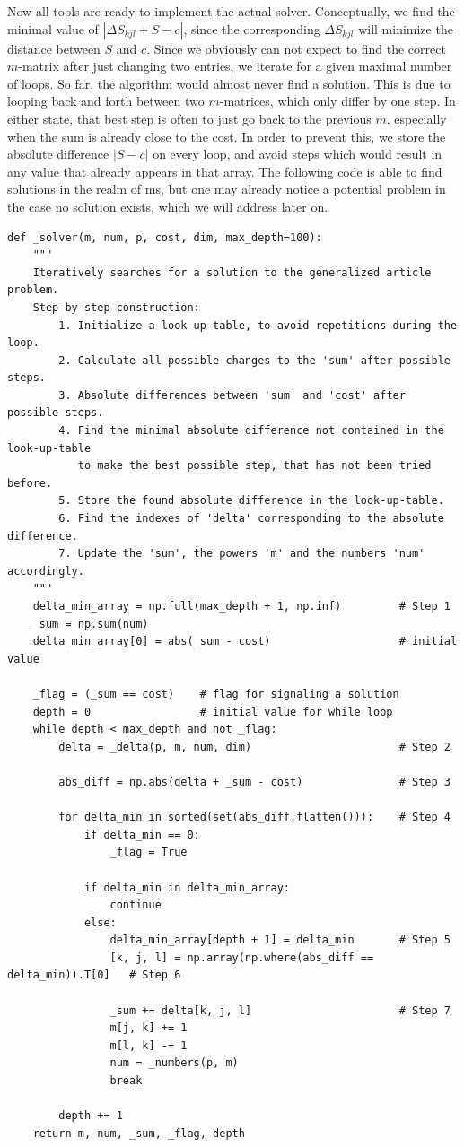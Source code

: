 \documentclass[english, parskip=full]{scrartcl}
\begin{document}
Now all tools are ready to implement the actual solver. Conceptually, we find the minimal value of $|\Delta S_{kjl}+S-c|$, since the corresponding $\Delta S_{kjl}$ will minimize the distance between $S$ and $c$. Since we obviously can not expect to find the correct $m$-matrix after just changing two entries, we iterate for a given maximal number of loops. So far, the algorithm would almost never find a solution. This is due to looping back and forth between two $m$-matrices, which only differ by one step. In either state, that best step is often to just go back to the previous $m$, especially when the sum is already close to the cost. In order to prevent this, we store the absolute difference $|S-c|$ on every loop, and avoid steps which would result in any value that already appears in that array. The following code is able to find solutions in the realm of ms, but one may already notice a potential problem in the case no solution exists, which we will address later on.
\begin{verbatim}
def _solver(m, num, p, cost, dim, max_depth=100):
    """
    Iteratively searches for a solution to the generalized article problem.
    Step-by-step construction:
        1. Initialize a look-up-table, to avoid repetitions during the loop.
        2. Calculate all possible changes to the 'sum' after possible steps.
        3. Absolute differences between 'sum' and 'cost' after possible steps.
        4. Find the minimal absolute difference not contained in the look-up-table 
           to make the best possible step, that has not been tried before.
        5. Store the found absolute difference in the look-up-table.
        6. Find the indexes of 'delta' corresponding to the absolute difference.
        7. Update the 'sum', the powers 'm' and the numbers 'num' accordingly.
    """
    delta_min_array = np.full(max_depth + 1, np.inf)         # Step 1
    _sum = np.sum(num)
    delta_min_array[0] = abs(_sum - cost)                    # initial value
    
    _flag = (_sum == cost)    # flag for signaling a solution
    depth = 0                 # initial value for while loop
    while depth < max_depth and not _flag:
        delta = _delta(p, m, num, dim)                       # Step 2
        
        abs_diff = np.abs(delta + _sum - cost)               # Step 3
            
        for delta_min in sorted(set(abs_diff.flatten())):    # Step 4
            if delta_min == 0:
                _flag = True
                
            if delta_min in delta_min_array:
                continue
            else:
                delta_min_array[depth + 1] = delta_min       # Step 5
                [k, j, l] = np.array(np.where(abs_diff == delta_min)).T[0]   # Step 6
                
                _sum += delta[k, j, l]                       # Step 7     
                m[j, k] += 1                  
                m[l, k] -= 1
                num = _numbers(p, m)
                break
            
        depth += 1
    return m, num, _sum, _flag, depth
\end{verbatim}
\end{document}
